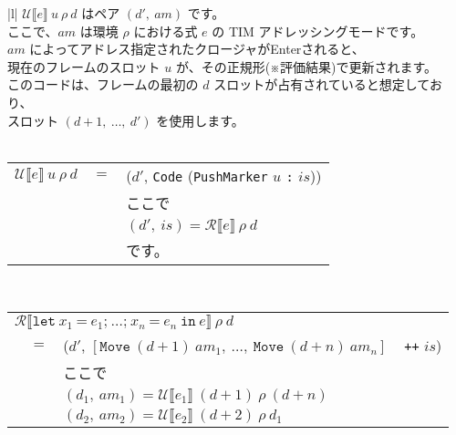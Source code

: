 \documentclass{jarticle}
\begin{document}
\begin{tabular} {|l|} \hline
	$\mathcal{U} \llbracket e \rrbracket ~ u ~ \rho ~ d$ はペア $(d', ~ am)$ です。 \\
	ここで、$am$ は環境 $\rho$ における式 $e$ の TIM アドレッシングモードです。     \\
	$am$ によってアドレス指定されたクロージャがEnterされると、                      \\
	現在のフレームのスロット $u$ が、その正規形(※評価結果)で更新されます。          \\
	このコードは、フレームの最初の $d$ スロットが占有されていると想定しており、     \\
	スロット $(d + 1, ~ \ldots, ~ d')$ を使用します。                               \\
	\\
	\begin{tabular}{r c l}
		$\mathcal{U} \llbracket e \rrbracket ~ u ~ \rho ~ d$ & $=$ & ($d'$, \texttt{Code} (\texttt{PushMarker} $u$ \texttt{:} $is$)) \\
		                                                     &     & ここで                                                          \\
		                                                     &     & $(d', ~ is) = \mathcal{R} \llbracket e \rrbracket ~ \rho ~ d$   \\
		                                                     &     & です。
	\end{tabular}
	\\ \hline
	\begin{tabular}{r c l}
		\multicolumn{3}{l}{$\mathcal{R} \llbracket \texttt{let} ~ x_1 ~ \texttt{=} ~ e_1\texttt{;} ~  \ldots \texttt{;} ~ x_n ~ \texttt{=} ~ e_n ~ \texttt{in} ~ e \rrbracket ~ \rho ~ d$} \\
		 & $=$ & ($d'$, $\left[ \texttt{Move} ~ (d + 1) ~ am_1, ~ \ldots, ~ \texttt{Move} ~ (d + n) ~ am_n \right]$ ~ \texttt{++} $is$)                                                    \\
		 &     & ここで                                                                                                                                                                    \\
		 &     & $(d_1, ~ am_1) = \mathcal{U} \llbracket e_1 \rrbracket ~ (d + 1) ~ \rho ~ (d + n)$                                                                                        \\
		 &     & $(d_2, ~ am_2) = \mathcal{U} \llbracket e_2 \rrbracket ~ (d + 2) ~ \rho ~ d_1$                                                                                            \\

\end{tabular}
\end{tabular}
\end{document}
